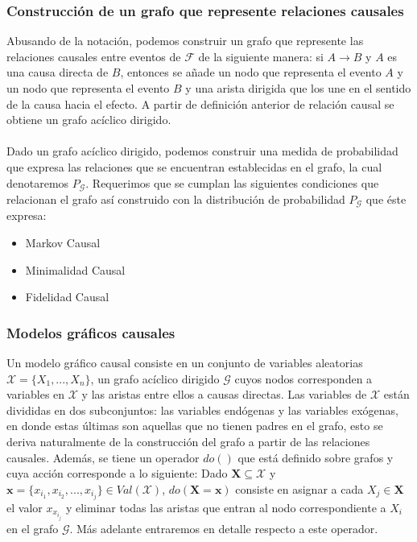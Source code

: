 \documentclass[11pt]{article}
\theoremstyle{plain}
\begin{document}
		\subsubsection{Construcción de un grafo que represente relaciones causales}
		Abusando de la notación, podemos construir un grafo que represente las relaciones causales entre eventos de $\mathcal{F}$ de la siguiente manera: si $A \to B$ y $A$ es una causa directa de $B$, entonces se añade un nodo que representa el evento $A$ y un nodo que representa el evento $B$ y una arista dirigida que los une en el sentido de la causa hacia el efecto. A partir de definición anterior de relación causal se obtiene un grafo acíclico dirigido.\\
\\		
		 Dado un grafo acíclico dirigido, podemos construir una medida de probabilidad que expresa las relaciones que se encuentran establecidas en el grafo, la cual denotaremos $P_{\mathcal{G}}$. Requerimos que se cumplan las siguientes condiciones que relacionan el grafo así construido con la distribución de probabilidad $P_{\mathcal{G}}$ que éste expresa:
		\begin{itemize}
		\item Markov Causal
		\item Minimalidad Causal
		\item Fidelidad Causal
		\end{itemize}
		\subsubsection{Modelos gráficos causales}
		Un modelo gráfico causal consiste en un conjunto de variables aleatorias $\mathcal{X}=\{ X_1,...,X_n \}$, un grafo acíclico dirigido $\mathcal{G}$ cuyos nodos corresponden a variables en $\mathcal{X}$ y las aristas entre ellos a causas directas. Las variables de $\mathcal{X}$ están divididas en dos subconjuntos: las variables endógenas y las variables exógenas, en donde estas últimas son aquellas que no tienen padres en el grafo, esto se deriva naturalmente de la construcción del grafo a partir de las relaciones causales. Además, se tiene un operador $do()$ que está definido sobre grafos y cuya acción corresponde a lo siguiente: Dado $\mathbf{X} \subseteq \mathcal{X}$ y $\mathbf{x} = \{ x_{i_1}, x_{i_2}, ... , x_{i_j} \} \in Val(\mathcal{X})$, $do(\mathbf{X} = \mathbf{x} )$ consiste en asignar a cada $X_j \in \mathbf{X}$ el valor $x_{x_{i_j}}$ y eliminar todas las aristas que entran al nodo correspondiente a $X_i$ en el grafo $\mathcal{G}$. Más adelante entraremos en detalle respecto a este operador.
\end{document}
